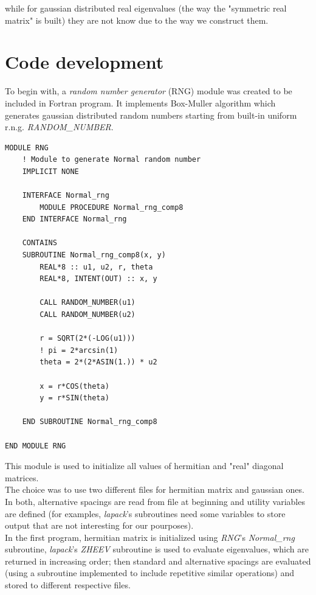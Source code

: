 \documentclass[12pt, a4paper, notitlepage]{report}
\begin{document}
while for gaussian distributed real eigenvalues (the way the "symmetric real matrix" is built) they are not know due to the way we construct them.


\section*{Code development}
To begin with, a \textit{random number generator} (RNG) module was created to be included in Fortran program. It implements Box-Muller algorithm which generates gaussian distributed random numbers starting from built-in uniform r.n.g. \textit{RANDOM\_NUMBER}.

\begin{lstlisting}
MODULE RNG
	! Module to generate Normal random number
	IMPLICIT NONE
	
	INTERFACE Normal_rng
		MODULE PROCEDURE Normal_rng_comp8
	END INTERFACE Normal_rng
	
	CONTAINS
	SUBROUTINE Normal_rng_comp8(x, y)
		REAL*8 :: u1, u2, r, theta
		REAL*8, INTENT(OUT) :: x, y
		
		CALL RANDOM_NUMBER(u1)
		CALL RANDOM_NUMBER(u2)
		
		r = SQRT(2*(-LOG(u1)))
		! pi = 2*arcsin(1)
		theta = 2*(2*ASIN(1.)) * u2
		
		x = r*COS(theta)
		y = r*SIN(theta)
	
	END SUBROUTINE Normal_rng_comp8

END MODULE RNG
\end{lstlisting}

This module is used to initialize all values of hermitian and "real" diagonal matrices.\\
The choice was to use two different files for hermitian matrix and gaussian ones. In both, alternative spacings are read from file at beginning and utility variables are defined (for examples, \textit{lapack}'s subroutines need some variables to store output that are not interesting for our pourposes).\\
In the first program, hermitian matrix is initialized using \textit{RNG}'s \textit{Normal\_rng} subroutine, \textit{lapack}'s \textit{ZHEEV} subroutine is used to evaluate eigenvalues, which are returned in increasing order; then standard and alternative spacings are evaluated (using a subroutine implemented to include repetitive similar operations) and stored to different respective files.\\
\end{document}
